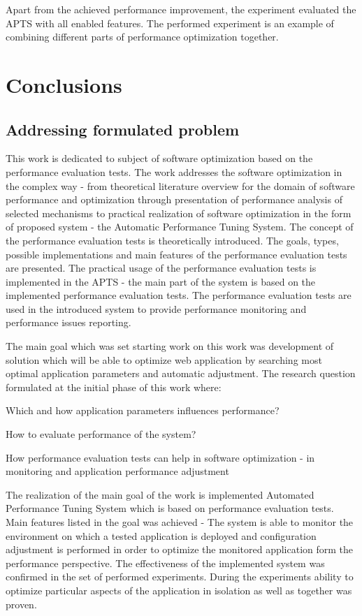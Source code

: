 \documentclass[10pt,a4paper]{article}
\let\tempone\itemize
\let\temptwo\enditemize
\renewenvironment{itemize}{\tempone\addtolength{\itemsep}{-0.4\baselineskip}}{\temptwo}
\begin{document}
Apart from the achieved performance improvement, the experiment evaluated the APTS with all enabled features. The performed experiment is an example of combining different parts of performance optimization together.    

\section{Conclusions} \label{section:conclusions}

\subsection{Addressing formulated problem}

This work is dedicated to subject of software optimization based on the performance evaluation tests. The work addresses the software optimization in the complex way - from theoretical literature overview for the domain of software performance and optimization through presentation of performance analysis of selected mechanisms to practical realization of software optimization in the form of proposed system - the Automatic Performance Tuning System. The concept of the performance evaluation tests is theoretically introduced. The goals, types, possible implementations and main features of the performance evaluation tests are presented. The practical usage of the performance evaluation tests is implemented in the APTS - the main part of the system is based on the implemented performance evaluation tests. The performance evaluation tests are used in the introduced system to provide performance monitoring and performance issues reporting.

The main goal which was set starting work on this work was development of solution which will be able to optimize web application by searching most optimal application parameters and automatic adjustment.  The research question formulated at the initial phase of this work where:
\begin{itemize}
\item Which and how application parameters influences performance?
\item How to evaluate performance of the system?
\item How performance evaluation tests can help in software optimization - in monitoring and application performance adjustment
\end{itemize} 

The realization of the main goal of the work is implemented Automated Performance Tuning System which is based on performance evaluation tests. Main features listed in the goal was achieved - The system is able to monitor the environment on which a tested application is deployed and configuration adjustment is performed in order to optimize the monitored application form the performance perspective. The effectiveness of the implemented system was confirmed in the set of performed experiments. During the experiments ability to optimize particular aspects of the application in isolation as well as together was proven. 
\end{document}
